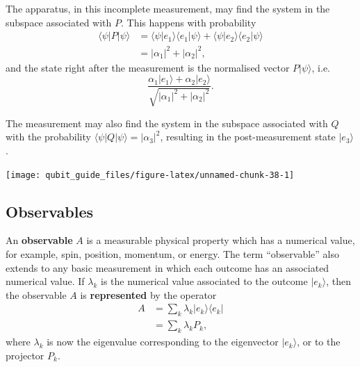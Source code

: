 \documentclass[fleqn,a4paper]{article}
\theoremstyle{definition}
\theoremstyle{definition}
\theoremstyle{definition}
\theoremstyle{definition}
\theoremstyle{remark}
\begin{document}
The apparatus, in this incomplete measurement, may find the system in the subspace associated with \(P\).
This happens with probability
\[
  \begin{aligned}
    \langle\psi|P|\psi\rangle
    &= \langle\psi|e_1\rangle \langle e_1|\psi\rangle + \langle\psi|e_2\rangle \langle e_2|\psi\rangle
  \\&= |\alpha_1|^2 + |\alpha_2|^2,
  \end{aligned}
\]
and the state right after the measurement is the normalised vector \(P|\psi\rangle\), i.e.
\[
  \frac{\alpha_1|e_1\rangle+\alpha_2|e_2\rangle}{\sqrt{|\alpha_1|^2 + |\alpha_2|^2}}.
\]

The measurement may also find the system in the subspace associated with \(Q\) with the probability \(\langle\psi|Q|\psi\rangle = |\alpha_3|^2\), resulting in the post-measurement state \(|e_3\rangle\).

\begin{center}\texttt{[image: qubit\_guide\_files/figure-latex/unnamed-chunk-38-1]} \end{center}

\hypertarget{observables}{%
\subsection{Observables}\label{observables}}

An \textbf{observable} \(A\) is a measurable physical property which has a numerical value, for example, spin, position, momentum, or energy.
The term ``observable'' also extends to any basic measurement in which each outcome has an associated numerical value.
If \(\lambda_k\) is the numerical value associated to the outcome \(|e_k\rangle\), then the observable \(A\) is \textbf{represented} by the operator
\[
  \begin{aligned}
    A
    &= \sum_k \lambda_k |e_k\rangle\langle e_k|
  \\&= \sum_k \lambda_k P_k,
  \end{aligned}
\]
where \(\lambda_k\) is now the eigenvalue corresponding to the eigenvector \(|e_k\rangle\), or to the projector \(P_k\).
\end{document}
